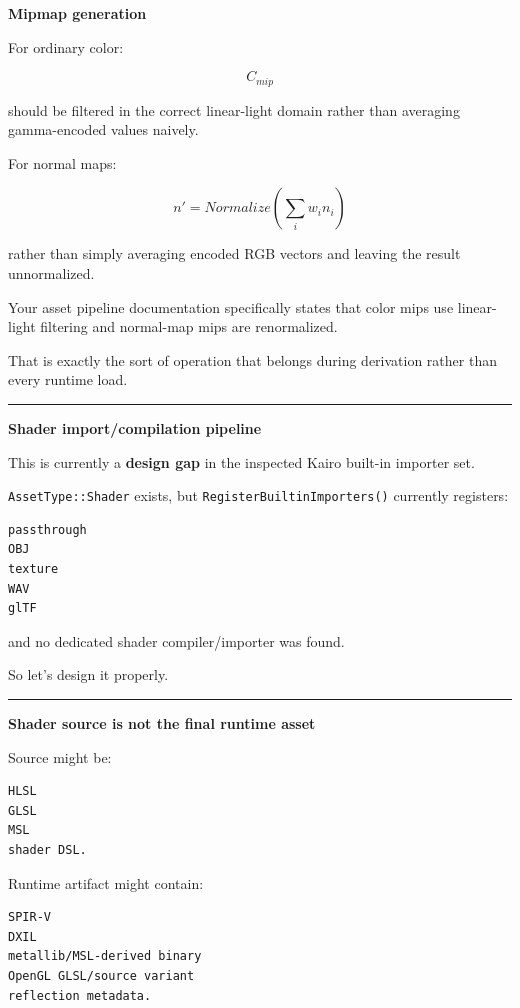 \textbf{Mipmap generation}

For ordinary color:

\[
C_{mip}
\]

should be filtered in the correct linear-light domain rather than averaging gamma-encoded values naively.

For normal maps:

\[
n'=
Normalize\left(
\sum_i w_i n_i
\right)
\]

rather than simply averaging encoded RGB vectors and leaving the result unnormalized.

Your asset pipeline documentation specifically states that color mips use linear-light filtering and normal-map mips are renormalized.

That is exactly the sort of operation that belongs during derivation rather than every runtime load.

\begin{center}\rule{0.5\linewidth}{0.5pt}\end{center}

\textbf{Shader import/compilation pipeline}

This is currently a \textbf{design gap} in the inspected Kairo built-in importer set.

\texttt{AssetType::Shader} exists, but \texttt{RegisterBuiltinImporters()} currently registers:

\begin{verbatim}
passthrough
OBJ
texture
WAV
glTF
\end{verbatim}

and no dedicated shader compiler/importer was found.

So let's design it properly.

\begin{center}\rule{0.5\linewidth}{0.5pt}\end{center}

\textbf{Shader source is not the final runtime asset}

Source might be:

\begin{verbatim}
HLSL
GLSL
MSL
shader DSL.
\end{verbatim}

Runtime artifact might contain:

\begin{verbatim}
SPIR-V
DXIL
metallib/MSL-derived binary
OpenGL GLSL/source variant
reflection metadata.
\end{verbatim}

